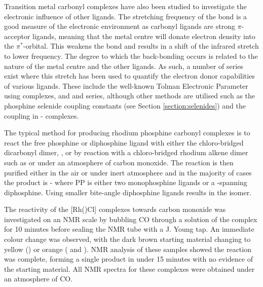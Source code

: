 Transition metal carbonyl complexes have also been studied to investigate the electronic influence of other ligands.  The stretching frequency of the  bond is a good measure of the electronic environment as carbonyl ligands are strong $\pi$-acceptor ligands, meaning that the metal centre will donate electron density into the $\pi^*$-orbital.  This weakens the  bond and results in a shift of the infrared  stretch to lower frequency.  The degree to which the back-bonding occurs is related to the nature of the metal centre and the other ligands.  As such, a number of series exist where this stretch has been used to quantify the electron donor capabilities of various ligands.  These include the well-known Tolman Electronic Parameter using \ce{[Ni(CO)3L]} complexes,\cite{Tolman1977, Tolman1970} and \ce{[Mo(CO)5L]} and \ce{[Rh(CO)ClL2]} series,\cite{Banger2009}  although other methods are utilised such as the phosphine selenide coupling constants (see Section \ref{section:selenides}) and the \JPtP{} coupling in \cis-\ce{[PtCl2P2]} complexes.\cite{Pregosin2012}

The typical method for producing rhodium phosphine carbonyl complexes is to react the free phosphine or diphosphine ligand with either the chloro-bridged dicarbonyl dimer, , or by reaction with a chloro-bridged rhodium alkene dimer such as  or  under an atmosphere of carbon monoxide.  The reaction is then purified either in the air or under inert atmosphere and in the majority of cases the product is \trans-\ce{[Rh(CO)(PP)Cl]} where PP is either two monophosphine ligands or a \trans-spanning diphosphine.  Using smaller bite-angle diphosphine ligands results in the \cis{} isomer.  

The reactivity of the [Rh(\tBuxantphosk)Cl] complexes towards carbon monoxide was investigated on an NMR scale by bubbling CO through a  solution of the complex for 10 minutes before sealing the NMR tube with a J. Young tap.  An immediate colour change was observed, with the dark brown starting material changing to yellow (\tBusixantphos) or orange (\tButhixantphos{} and \tBuxantphos).  NMR analysis of these samples showed the reaction was complete, forming a single product in under 15 minutes with no evidence of the starting material.  All NMR spectra for these complexes were obtained under an atmosphere of CO.

